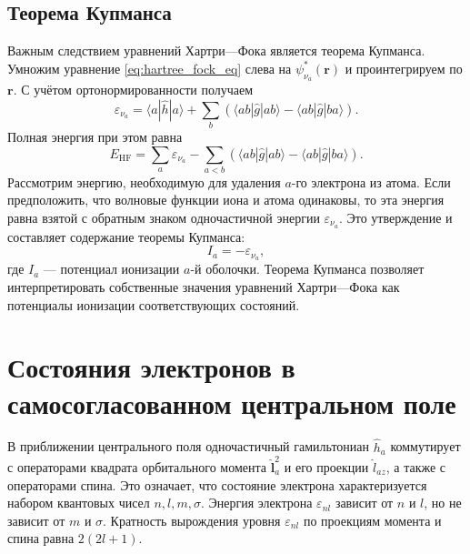 \documentclass[a4paper, 12pt]{article}
\numberwithin{equation}{section}
\begin{document}
\subsection{Теорема Купманса}
\label{subsec:koopmans_theorem}

Важным следствием уравнений Хартри---Фока является теорема Купманса. Умножим уравнение \eqref{eq:hartree_fock_eq} слева на $\psi_{\nu_a}^*(\bm{r})$ и проинтегрируем по $\bm{r}$. С учётом ортонормированности получаем
\begin{equation}
\label{eq:koopmans_derivation}
\varepsilon_{\nu_a} = \langle a | \hat{h} | a \rangle + \sum_{b} \left( \langle a b | \hat{g} | a b \rangle - \langle a b | \hat{g} | b a \rangle \right).
\end{equation}
Полная энергия при этом равна
\begin{equation}
\label{eq:total_energy_from_epsilon}
E_{\text{HF}} = \sum_{a} \varepsilon_{\nu_a} - \sum_{a < b} \left( \langle a b | \hat{g} | a b \rangle - \langle a b | \hat{g} | b a \rangle \right).
\end{equation}
Рассмотрим энергию, необходимую для удаления $a$-го электрона из атома. Если предположить, что волновые функции иона и атома одинаковы, то эта энергия равна взятой с обратным знаком одночастичной энергии $\varepsilon_{\nu_a}$. Это утверждение и составляет содержание теоремы Купманса:
\begin{equation}
\label{eq:koopmans}
I_a = -\varepsilon_{\nu_a},
\end{equation}
где $I_a$ --- потенциал ионизации $a$-й оболочки. Теорема Купманса позволяет интерпретировать собственные значения уравнений Хартри---Фока как потенциалы ионизации соответствующих состояний.

\section{Состояния электронов в самосогласованном центральном поле}
\label{sec:electron_states_central_field}

В приближении центрального поля одночастичный гамильтониан $\hat{h}_a$ коммутирует с операторами квадрата орбитального момента $\hat{\bm{l}}_a^2$ и его проекции $\hat{l}_{az}$, а также с операторами спина. Это означает, что состояние электрона характеризуется набором квантовых чисел $n, l, m, \sigma$. Энергия электрона $\varepsilon_{nl}$ зависит от $n$ и $l$, но не зависит от $m$ и $\sigma$. Кратность вырождения уровня $\varepsilon_{nl}$ по проекциям момента и спина равна $2(2l+1)$.
\end{document}
